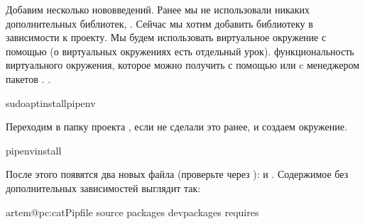 \documentclass[letterpaper,10pt,russian]{sphinxmanual}
\begin{document}
\sphinxAtStartPar
Добавим несколько нововведений. Ранее мы не использовали никаких дополнительных библиотек, . Сейчас мы хотим добавить библиотеку  в зависимости к проекту. Мы будем использовать виртуальное окружение с помощью  (о виртуальных окружениях есть отдельный урок).   функциональность виртуального окружения, которое можно получить с помощью  или  c менеджером пакетов . .

\begin{sphinxVerbatim}[commandchars=\\\{\}]
sudoaptinstallpipenv
\end{sphinxVerbatim}

\sphinxAtStartPar
Переходим в папку проекта , если не сделали это ранее, и создаем окружение.

\begin{sphinxVerbatim}[commandchars=\\\{\}]
pipenvinstall
\end{sphinxVerbatim}

\sphinxAtStartPar
После этого появятся два новых файла (проверьте через ):  и . Содержимое  без дополнительных зависимостей выглядит так:

\begin{sphinxVerbatim}[commandchars=\\\{\}]
artem@pc:\PYGZti{}\PYGZdl{}catPipfile
\PYG{o}{[}\PYG{o}{[}source\PYG{o}{]}\PYG{o}{]}
\PYG{o}{[}packages\PYG{o}{]}
\PYG{o}{[}dev\PYGZhy{}packages\PYG{o}{]}
\PYG{o}{[}requires\PYG{o}{]}
\end{sphinxVerbatim}
\end{document}
